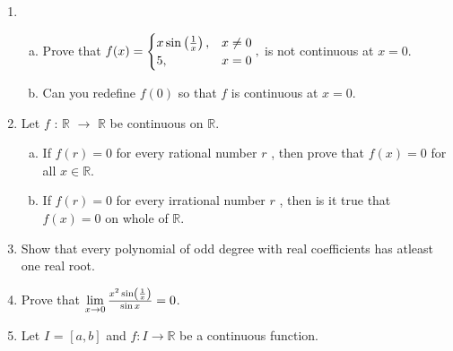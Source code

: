 \documentclass[journal,12pt,onecolumn]{IEEEtran}
\begin{document}
\begin{enumerate}
\begin{enumerate}[(i)]
\end{enumerate}

\item
\setlength\itemsep{2em}
\begin{enumerate}[(a)]

\item Prove that 
 $
f(x)=\begin{cases}
x \sin \left(\frac{1}{x}\right),& x\neq0 \\
5,&x=0
\end{cases}
,$
is not continuous at $x=0$. 
\item Can you redefine $f(0)$ so that $f$ is continuous at $x=0$.
\end{enumerate}

\item Let $f$ : $\mathbb{R}$ $\rightarrow$ $\mathbb{R}$ be continuous on $\mathbb{R}$.

\setlength\itemsep{2em}
\begin{enumerate}[(a)]

\item If $f(r)=0$ for every rational number $r$ , then prove that $f(x)=0$ for all $x\in\mathbb{R}$.
\item If $f(r)=0$ for every irrational number $r$ , then is it true that $f(x)=0$ on whole of $\mathbb{R}$.
\end{enumerate}

\item Show that every polynomial of odd degree with real coefficients has atleast one real root.

\item
Prove that 
$\lim\limits_{x \to 0}{\frac{x^2\sin\left(\frac{1}{x}\right)}{\sin x}}=0$.

\item Let $I$ = $[a,b]$ and $f: I \rightarrow \mathbb{R}$ be a continuous function.


\end{enumerate}
\end{document}
